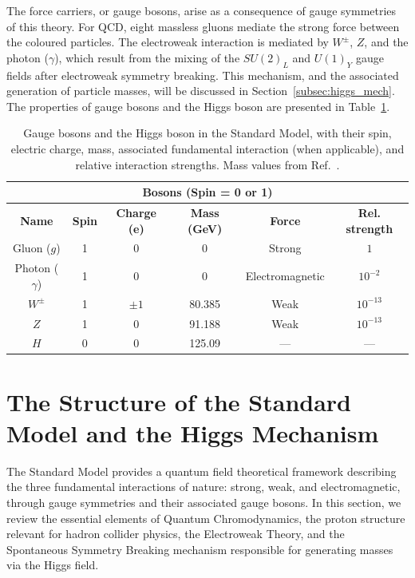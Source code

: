 \documentclass[11pt,twoside]{book}
\begin{document}
The force carriers, or gauge bosons, arise as a consequence of gauge symmetries of this theory. For \acrshort{QCD}, eight massless gluons mediate the strong force between the coloured particles. The electroweak interaction is mediated by $W^\pm$, $Z$, and the photon ($\gamma$), which result from the mixing of the $SU(2)_L$ and $U(1)_Y$ gauge fields after electroweak symmetry breaking. This mechanism, and the associated generation of particle masses, will be discussed in Section~\ref{subsec:higgs_mech}. The properties of gauge bosons and the Higgs boson are presented in Table~\ref{tab:bosons}.
\begin{table}[htbp]
\centering
\small
\renewcommand{\arraystretch}{1.2}
\setlength{\tabcolsep}{6pt}
\begin{tabular}{cccccc}
\multicolumn{6}{c}{\textbf{Bosons (Spin = 0 or 1)}} \\
\toprule
\textbf{Name} & \textbf{Spin} & \textbf{Charge (e)} & \textbf{Mass (GeV)} & \textbf{Force} & \textbf{Rel. strength} \\
\midrule
Gluon ($g$)     & 1 & 0        & 0       & Strong         & $1$ \\
Photon ($\gamma$) & 1 & 0        & 0       & Electromagnetic & $10^{-2}$ \\
$W^{\pm}$       & 1 & $\pm 1$  & 80.385  & Weak           & $10^{-13}$ \\
$Z$             & 1 & 0        & 91.188  & Weak           & $10^{-13}$ \\
$H$             & 0 & 0        & 125.09  & —              & — \\
\bottomrule
\end{tabular}
\caption{Gauge bosons and the Higgs boson in the Standard Model, with their spin, electric charge, mass, associated fundamental interaction (when applicable), and relative interaction strengths. Mass values from Ref.~\cite{ParticleDataGroup}.}
\label{tab:bosons}
\end{table}
\section{The Structure of the Standard Model and the Higgs Mechanism}
\label{sec:\acrshort{SM}_higgs_mech}
The Standard Model provides a quantum field theoretical framework describing the three fundamental interactions of nature: strong, weak, and electromagnetic, through gauge symmetries and their associated gauge bosons. In this section, we review the essential elements of Quantum Chromodynamics, the proton structure relevant for hadron collider physics, the Electroweak Theory, and the Spontaneous Symmetry Breaking mechanism responsible for generating masses via the Higgs field.
\end{document}
